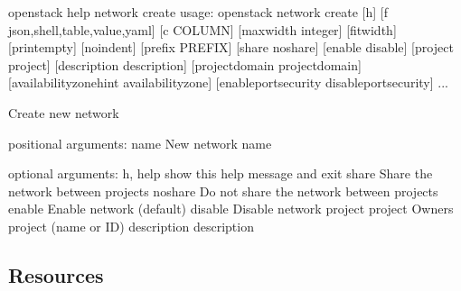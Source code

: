\documentclass[letterpaper,10pt,english]{sphinxmanual}
\begin{document}
\begin{sphinxVerbatim}[commandchars=\\\{\}]
\PYGZdl{} openstack help network create
usage: openstack network create [\PYGZhy{}h] [\PYGZhy{}f \PYGZob{}json,shell,table,value,yaml\PYGZcb{}]
                                [\PYGZhy{}c COLUMN] [\PYGZhy{}\PYGZhy{}max\PYGZhy{}width \PYGZlt{}integer\PYGZgt{}]
                                [\PYGZhy{}\PYGZhy{}fit\PYGZhy{}width] [\PYGZhy{}\PYGZhy{}print\PYGZhy{}empty] [\PYGZhy{}\PYGZhy{}noindent]
                                [\PYGZhy{}\PYGZhy{}prefix PREFIX] [\PYGZhy{}\PYGZhy{}share \textbar{} \PYGZhy{}\PYGZhy{}no\PYGZhy{}share]
                                [\PYGZhy{}\PYGZhy{}enable \textbar{} \PYGZhy{}\PYGZhy{}disable] [\PYGZhy{}\PYGZhy{}project \PYGZlt{}project\PYGZgt{}]
                                [\PYGZhy{}\PYGZhy{}description \PYGZlt{}description\PYGZgt{}]
                                [\PYGZhy{}\PYGZhy{}project\PYGZhy{}domain \PYGZlt{}project\PYGZhy{}domain\PYGZgt{}]
                                [\PYGZhy{}\PYGZhy{}availability\PYGZhy{}zone\PYGZhy{}hint \PYGZlt{}availability\PYGZhy{}zone\PYGZgt{}]
                                [\PYGZhy{}\PYGZhy{}enable\PYGZhy{}port\PYGZhy{}security \textbar{} \PYGZhy{}\PYGZhy{}disable\PYGZhy{}port\PYGZhy{}security]
...

Create new network

positional arguments:
  \PYGZlt{}name\PYGZgt{}                New network name

optional arguments:
  \PYGZhy{}h, \PYGZhy{}\PYGZhy{}help            show this help message and exit
  \PYGZhy{}\PYGZhy{}share               Share the network between projects
  \PYGZhy{}\PYGZhy{}no\PYGZhy{}share            Do not share the network between projects
  \PYGZhy{}\PYGZhy{}enable              Enable network (default)
  \PYGZhy{}\PYGZhy{}disable             Disable network
  \PYGZhy{}\PYGZhy{}project \PYGZlt{}project\PYGZgt{}   Owner\PYGZsq{}s project (name or ID)
  \PYGZhy{}\PYGZhy{}description \PYGZlt{}description\PYGZgt{}
\end{sphinxVerbatim}


\subsection{Resources}
\label{\detokenize{basics/README:id4}}
\end{document}
